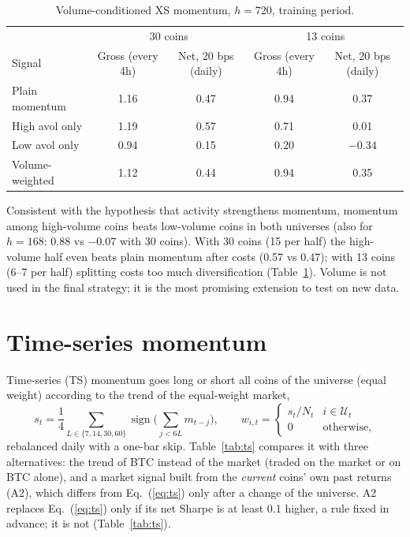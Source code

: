 \documentclass[aps,prl,onecolumn,superscriptaddress,nofootinbib]{revtex4-2}
\begin{document}
	\begin{table}[!htbp]
		\caption{Volume-conditioned XS momentum, $h = 720$, training period.}
		\label{tab:volume}
		\begin{ruledtabular}
			\begin{tabular}{lcccc}
				& \multicolumn{2}{c}{30 coins} & \multicolumn{2}{c}{13 coins} \\
				Signal & Gross (every 4h) & Net, 20 bps (daily) & Gross (every 4h) & Net, 20 bps (daily) \\
				\hline
				Plain momentum   & 1.16 & 0.47 & 0.94 & 0.37 \\
				High avol only   & 1.19 & 0.57 & 0.71 & 0.01 \\
				Low avol only    & 0.94 & 0.15 & 0.20 & $-0.34$ \\
				Volume-weighted  & 1.12 & 0.44 & 0.94 & 0.35 \\
			\end{tabular}
		\end{ruledtabular}
	\end{table}

	Consistent with the hypothesis that activity strengthens momentum, momentum among high-volume coins beats low-volume coins in both universes (also for $h = 168$: 0.88 vs $-0.07$ with 30 coins). With 30 coins (15 per half) the high-volume half even beats plain momentum after costs (0.57 vs 0.47); with 13 coins (6--7 per half) splitting costs too much diversification (Table~\ref{tab:volume}). Volume is not used in the final strategy; it is the most promising extension to test on new data.

	\section{Time-series momentum}
	\label{sec:ts}

	Time-series (TS) momentum goes long or short all coins of the universe (equal weight) according to the trend of the equal-weight market,
	\begin{equation}
		s_t = \frac14 \sum_{L \in \{7,14,30,60\}} \operatorname{sign}\!\Big(\sum_{j<6L} m_{t-j}\Big), \qquad
		w_{i,t} =
		\begin{cases}
			s_t / N_t & i \in \mathcal U_t \\
			0 & \text{otherwise,}
		\end{cases}
		\label{eq:ts}
	\end{equation}
	rebalanced daily with a one-bar skip. Table~\ref{tab:ts} compares it with three alternatives: the trend of BTC instead of the market (traded on the market or on BTC alone), and a market signal built from the \emph{current} coins' own past returns (A2), which differs from Eq.~(\ref{eq:ts}) only after a change of the universe. A2 replaces Eq.~(\ref{eq:ts}) only if its net Sharpe is at least 0.1 higher, a rule fixed in advance; it is not (Table~\ref{tab:ts}).
\end{document}
